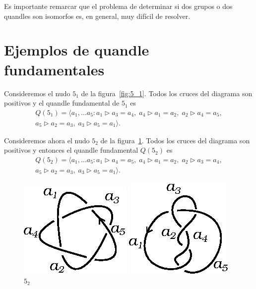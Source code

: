 \documentclass[graybox]{svmult}
\begin{document}
	Es importante remarcar que el problema de determinar si dos grupos o dos
	quandles son isomorfos es, en general, muy difícil de resolver.

\section{Ejemplos de quandle fundamentales}

	\label{block:5_1:fundamental_quandle}
	\label{block:5_2:fundamental_quandle}

    Consideremos el nudo $5_1$ de la figura~\ref{fig:5_1}. Todos los cruces del
    diagrama son positivos y el quandle fundamental de $5_1$ es
	\begin{multline}
        \label{eq:5_1}
        Q(5_1)=\langle a_1,\dots a_5:
		a_1\triangleright a_3=a_4,\;
        a_4\triangleright a_1=a_2,\;
        a_2\triangleright a_4=a_5,\\
        a_5\triangleright a_2=a_3,\; 
        a_3\triangleright a_5=a_1\rangle.
    \end{multline}

    Consideremos ahora el nudo $5_2$ de la figura~\ref{fig:5_2}. Todos los
    cruces del diagrama son positivos y entonces el quandle fundamental
    $Q(5_2)$ es
	\begin{multline}
        Q(5_2)=\langle a_1,\dots a_5:
		a_1\triangleright a_4=a_5,\;
		a_4\triangleright a_1=a_2,\;
		a_2\triangleright a_3=a_4,\\
		a_5\triangleright a_2=a_3,\;
		a_3\triangleright a_5=a_1\rangle.
	\end{multline}

	\begin{figure}[ht]
		\centering
		\begin{minipage}{0.4\textwidth}
			\centering
			\includegraphics[scale=0.7]{images/5_1}
			\caption{$5_1$}
			\label{fig:5_1}
		\end{minipage}
		\begin{minipage}{0.4\textwidth}
			\centering
			\includegraphics[scale=0.7]{images/5_2}
			\caption{$5_2$}
			\label{fig:5_2}
		\end{minipage}
	\end{figure}
\end{document}
